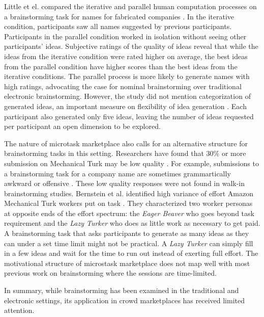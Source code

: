 Little et el. compared the iterative and parallel human computation processes on a brainstorming task for names for fabricated companies \cite{little2010exploring}. In the iterative condition, participants saw all names suggested by previous participants. Participants in the parallel condition worked in isolation without seeing other participants' ideas. Subjective ratings of the quality of ideas reveal that while the ideas from the iterative condition were rated higher on average, the best ideas from the parallel condition have higher scores than the best ideas from the iterative conditions. The parallel process is more likely to generate names with high ratings, advocating the case for nominal brainstorming over traditional electronic brainstorming. However, the study did not mention categorization of generated ideas, an important measure on flexibility of idea generation \cite{lewis2011affective, nijstad_how_2006, finke1992creative, shah2003metrics}. Each participant also generated only five ideas, leaving the number of ideas requested per participant an open dimension to be explored.

The nature of microtask marketplace also calls for an alternative structure for brainstorming tasks in this setting. Researchers have found that 30\% or more submission on Mechanical Turk may be low quality \cite{kittur2008crowdsourcing}. For example, submissions to a brainstorming task for a company name are sometimes grammartically awkward or offensive \cite{little2010exploring}. These low quality responses were not found in walk-in brainstorming studies. Bernstein et al. identified high variance of effort Amazon Mechanical Turk workers put on task \cite{soylent}. They characterized two worker personas at opposite ends of the effort spectrum: the {\em Eager Beaver\/} who goes beyond task requirement and the {\em Lazy Turker\/} who does as little work as necessary to get paid. A brainstorming task that asks participants to generate as many ideas as they can under a set time limit might not be practical. A {\em Lazy Turker\/} can simply fill in a few ideas and wait for the time to run out instead of exerting full effort. The motivational structure of microstask marketplace does not map well with most previous work on brainstorming where the sessions are time-limited. 



In summary, while brainstorming has been examined in the traditional and electronic settings, its application in crowd marketplaces has received limited attention. 
